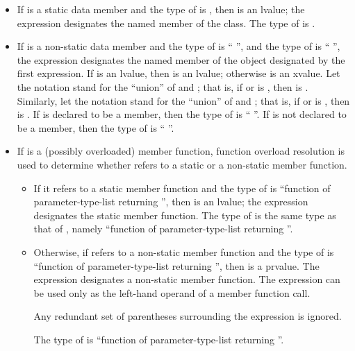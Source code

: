 \begin{itemize}
\item If  is a static data member and the type of 
is , then  is an lvalue; the expression designates
the named member of the class. The type of  is .

\item If  is a non-static data member and the type of
 is `` '', and the type of 
is `` '', the expression designates the named
member of the object designated by the first expression. If 
is an lvalue, then  is an lvalue;
otherwise  is an xvalue.
Let the notation  stand for the ``union'' of
 and ; that is, if  or 
is , then  is . Similarly,
let the notation  stand for the ``union'' of 
and ; that is, if  or  is
, then  is . If  is
declared to be a  member, then the type of 
is `` ''. If  is not declared to be a
 member, then the type of  is
``  ''.

\item If  is a (possibly overloaded) member function, function
overload resolution is used to determine whether
 refers to a static or a non-static member function.

\begin{itemize}
\item If it refers to a static member function and the type of
 is ``function of parameter-type-list returning '',
then  is an lvalue; the expression designates the static
member function. The type of  is the same type as that of
, namely ``function of parameter-type-list returning
''.

\item Otherwise, if  refers to a non-static member
function and the type of  is ``function of
parameter-type-list \cv{}  returning '', then
 is a prvalue. The expression designates a
non-static member function. The expression can be used only as the
left-hand operand of a member function call.
\begin{note}
Any redundant set of parentheses surrounding the expression
is ignored.
\end{note}
The type of  is
``function of parameter-type-list \cv{} returning ''.
\end{itemize}


\end{itemize}
